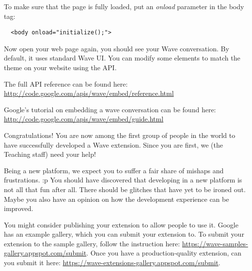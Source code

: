 To make sure that the page is fully loaded, put an \emph{onload} parameter in the 
body tag:

\begin{verbatim}
  <body onload="initialize();">
\end{verbatim}

Now open your web page again, you should see your Wave
conversation. By default, it uses standard Wave UI. You can modify
some elements to match the theme on your website using the API.

The full API reference can be found
here: \url{http://code.google.com/apis/wave/embed/reference.html}

Google's tutorial on embedding a wave conversation can be found
here: \url{http://code.google.com/apis/wave/embed/guide.html}




Congratulations! You are now among the first group of people in the
world to have successfully developed a Wave extension. Since you are first,
we (the Teaching staff) need your help!

Being a new platform, we expect you to suffer a fair share of mishaps
and frustrations. :p You should have discovered that developing in a
new platform is not all that fun after all. There should be glitches
that have yet to be ironed out.  Maybe you also have an opinion on how
the development experience can be improved.


You might consider publishing your extension to allow people to use
it. Google has an example gallery, which you can submit your extension
to. To submit your extension to the sample gallery, follow the
instruction
here: \url{https://wave-samples-gallery.appspot.com/submit}. Once you
have a production-quality extension, can you submit it
here: \url{https://wave-extensions-gallery.appspot.com/submit}.

